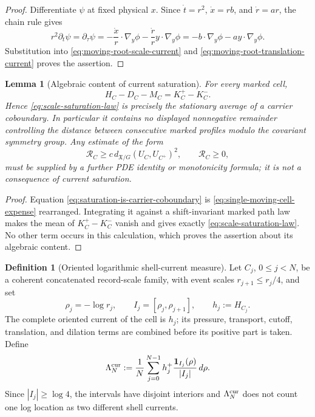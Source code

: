\documentclass[11pt]{amsart}
\numberwithin{equation}{section}
\theoremstyle{plain}
\newtheorem{lemma}[lemma]{Lemma}
\theoremstyle{definition}
\newtheorem{definition}[definition]{Definition}
\theoremstyle{remark}
\begin{document}
\begin{proof}
Differentiate \(\psi\) at fixed physical \(x\).  Since \(\dot t=r^2\),
\(\dot x=rb\), and \(\dot r=ar\), the chain rule gives
\[
 r^2\partial_t\psi
 =\partial_\tau\psi
 =-\frac{\dot x}{r}\cdot\nabla_y\phi
   -\frac{\dot r}{r}y\cdot\nabla_y\phi
 =-b\cdot\nabla_y\phi-a y\cdot\nabla_y\phi.
\]
Substitution into \eqref{eq:moving-root-scale-current} and
\eqref{eq:moving-root-translation-current} proves the assertion.
\end{proof}

\begin{lemma}[Algebraic content of current saturation]
\label{lem:no-modulation-coercivity-from-energy}
For every marked cell,
\begin{equation}\label{eq:saturation-is-carrier-coboundary}
 H_C-D_C-M_C=K_C^+-K_C^-.
\end{equation}
Hence \eqref{eq:scale-saturation-law} is precisely the stationary average of
a carrier coboundary.  In particular it contains no displayed nonnegative
remainder controlling the distance between consecutive marked profiles modulo
the covariant symmetry group.  Any estimate of the form
\begin{equation}\label{eq:required-modulation-coercivity}
 \mathcal R_C\ge
 c\,d_{\mathfrak X/G}(U_C,U_{C^+})^2,
 \qquad \mathcal R_C\ge0,
\end{equation}
must be supplied by a further PDE identity or monotonicity formula; it is not
a consequence of current saturation.
\end{lemma}

\begin{proof}
Equation \eqref{eq:saturation-is-carrier-coboundary} is
\eqref{eq:single-moving-cell-expense} rearranged.  Integrating it against a
shift-invariant marked path law makes the mean of
\(K_C^+-K_C^-\) vanish and gives exactly
\eqref{eq:scale-saturation-law}.  No other term occurs in this calculation,
which proves the assertion about its algebraic content.
\end{proof}

\begin{definition}[Oriented logarithmic shell-current measure]
\label{def:oriented-log-shell-current-measure}
Let \(C_j\), \(0\le j<N\), be a coherent concatenated record-scale family,
with event scales \(r_{j+1}\le r_j/4\), and set
\[
 \rho_j=-\log r_j,
 \qquad I_j=[\rho_j,\rho_{j+1}],
 \qquad h_j:=H_{C_j}.
\]
The complete oriented current of the cell is \(h_j\); its pressure,
transport, cutoff, translation, and dilation terms are combined before its
positive part is taken.  Define
\begin{equation}\label{eq:oriented-log-current-measure}
 \Lambda_N^{\rm cur}
 :=\frac1N\sum_{j=0}^{N-1}
   h_j^+\frac{\mathbf1_{I_j}(\rho)}{|I_j|}\,d\rho .
\end{equation}
Since \(|I_j|\ge\log4\), the intervals have disjoint interiors and
\(\Lambda_N^{\rm cur}\) does not count one log location as two different
shell currents.
\end{definition}
\end{document}
